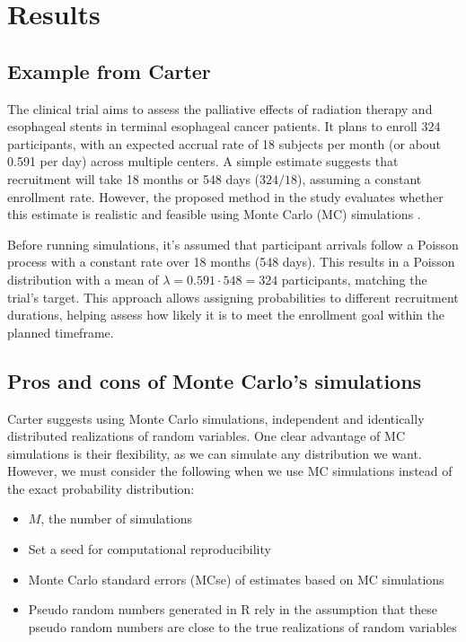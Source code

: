 




\chapter{Results}


\section{Example from Carter}

The clinical trial aims to assess the palliative effects of radiation therapy and esophageal stents in terminal esophageal cancer patients. It plans to enroll 324 participants, with an expected accrual rate of 18 subjects per month (or about 0.591 per day) across multiple centers. A simple estimate suggests that recruitment will take 18 months or 548 days ($324/18$), assuming a constant enrollment rate. However, the proposed method in the study evaluates whether this estimate is realistic and feasible using Monte Carlo (MC) simulations \citep{carter2004application}.

Before running simulations, it's assumed that participant arrivals follow a Poisson process with a constant rate over 18 months (548 days). This results in a Poisson distribution with a mean of $\lambda = 0.591 \cdot 548 = 324$ participants, matching the trial's target. This approach allows assigning probabilities to different recruitment durations, helping assess how likely it is to meet the enrollment goal within the planned timeframe.


\section{Pros and cons of Monte Carlo's simulations}

Carter suggests using Monte Carlo simulations, independent and identically distributed realizations of random variables. One clear advantage of MC simulations is their flexibility, as we can simulate any distribution we want. However, we must consider the following when we use MC simulations instead of the exact probability distribution:

\begin{itemize}
\item $M$, the number of simulations
\item Set a seed for computational reproducibility
\item Monte Carlo standard errors (MCse) of estimates based on MC simulations
\item Pseudo random numbers generated in R rely in the assumption that these pseudo random numbers are close to the true realizations of random variables \citep{held2014applied}
\end{itemize}


